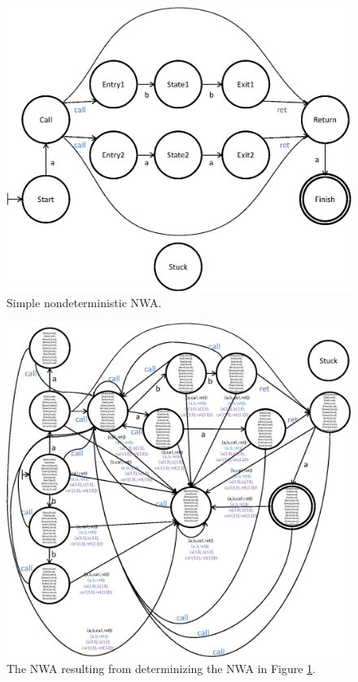 \documentclass{llncs}
\begin{document}
\begin{figure}[p]
  \centering
    \includegraphics[width=12cm]{Figures/Figure16.eps}
  \caption{Simple nondeterministic NWA.}
  \label{Fig:Det1}
\end{figure}


\begin{figure}[p]
  \centering
    \includegraphics[width=16cm]{Figures/Figure17.eps}
  \caption{The NWA resulting from determinizing the NWA in Figure \ref{Fig:Det1}.}
  \label{Fig:Det2}
\end{figure}
\end{document}
